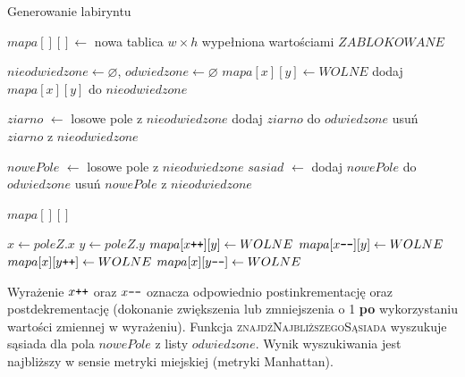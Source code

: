 \begin{algorithm}
	\caption{Generowanie labiryntu}\label{alg:mazegen}
  \begin{algorithmic}[1]
 
	\State $mapa[][] \gets$ nowa tablica $w \times h$ wypełniona wartościami $ZABLOKOWANE$

	\State $nieodwiedzone \gets \varnothing$, $odwiedzone \gets \varnothing$ 
	 
		 
			\State $mapa[x][y] \gets WOLNE$
			\State dodaj $mapa[x][y]$ do $nieodwiedzone$
		\EndFor
	\EndFor

	\State $ziarno$ $\gets$ losowe pole z $nieodwiedzone$
	\State dodaj $ziarno$ do $odwiedzone$ 
	\State usuń $ziarno$ z $nieodwiedzone$

	 
		\State $nowePole$ $\gets$ losowe pole z $nieodwiedzone$
		\State $sasiad$ $\gets$ 
		\State {}
		\State dodaj $nowePole$ do $odwiedzone$ 
		\State usuń $nowePole$ z $nieodwiedzone$
	\EndWhile

	 $mapa[][]$
\EndFunction

\State 
{}
	\State $x \gets poleZ.x$
	\State $y \gets poleZ.y$
	 
		\State $mapa[x\verb-++-][y] \gets WOLNE$ 
	\EndWhile
	 
		\State $mapa[x\verb+--+][y] \gets WOLNE$ 
	\EndWhile
	 
		\State $mapa[x][y\verb-++-] \gets WOLNE$ 
	\EndWhile
	 
		\State $mapa[x][y\verb+--+] \gets WOLNE$ 
	\EndWhile
\EndFunction
  \end{algorithmic}
\end{algorithm}

Wyrażenie $x\verb-++-$ oraz $x\verb+--+$ oznacza odpowiednio postinkrementację oraz postdekrementację (dokonanie zwiększenia lub zmniejszenia o 1 {\bf po} wykorzystaniu wartości zmiennej w wyrażeniu).
Funkcja \textsc{znajdźNajbliższegoSąsiada} wyszukuje sąsiada dla pola $nowePole$ z listy $odwiedzone$. Wynik wyszukiwania jest najbliższy w sensie metryki miejskiej (metryki Manhattan).

